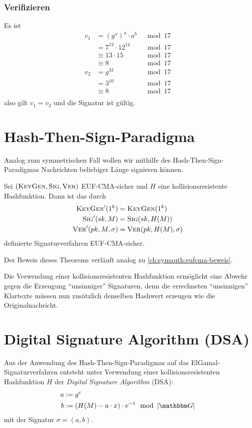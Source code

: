       \subsubsection*{Verifizieren}
      Es ist
      \begin{align*}
        v_1 & = (g^x)^a \cdot a^b  & \mod 17 \\
            & = 7^{12} \cdot 12^{14} & \mod 17 \\
            & \equiv 13 \cdot 15 & \mod 17 \\
            & \equiv 8 & \mod 17 \\
        v_2 & = g^M & \mod 17 \\
            &= 3^{10} & \mod 17\\
            &\equiv 8 & \mod 17\\
      \end{align*}
      also gilt $v_1=v_2$ und die Signatur ist gültig.
     

      \section{Hash-Then-Sign-Paradigma}
      Analog zum symmetrischen Fall wollen wir mithilfe des
      Hash-Then-Sign-Paradigmas Nachrichten beliebiger Länge signieren können.
      \begin{theorem}
        Sei $(\textsc{KeyGen}, \textsc{Sig}, \textsc{Ver})$ EUF-CMA-sicher und $H$ eine
        kollisionsresistente Hashfunktion. Dann ist das durch  
        \begin{align*}
          \textsc{KeyGen}'(1^k) &= \textsc{KeyGen}(1^k)\\
          \textsc{Sig}'(sk,M) &= \textsc{Sig}(sk,H(M))\\
          \textsc{Ver}'(pk,M,\sigma) &= \textsc{Ver}(pk,H(M),\sigma)
        \end{align*}
        definierte Signaturverfahren EUF-CMA-sicher.~\\
      \end{theorem}

      Der Beweis dieses Theorems verläuft analog zu \ref{ch:symauth:eufcma-beweis}.

      Die Verwendung einer kollisionsresistenten Hashfunktion ermöglicht
      eine Abwehr gegen die Erzeugung "`unsinniger"' Signaturen, denn
      die errechneten "`unsinnigen"' Klartexte müssen nun zusätzlich
      denselben Hashwert erzeugen wie die Originalnachricht. 


\section{Digital Signature Algorithm (DSA)}
Aus der Anwendung des Hash-Then-Sign-Paradigmas auf das ElGamal-Signaturverfahren entsteht unter Verwendung einer kollisionsresistenten
Hashfunktion $H$ der \emph{Digital Signature Algorithm} (DSA):
\begin{align*}
a &:= g^e\\
b &:= (H(M) - a \cdot x) \cdot e^{-1} \mod \left|\G\right|
\end{align*}
mit der Signatur $\sigma = (a,b)$.

